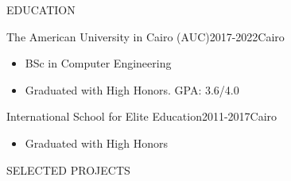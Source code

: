 \documentclass{resume}
\begin{document}
\begin{minipage}[t]{0.54\textwidth}

	\begin{rsection}{\MakeUppercase{education}}

		\begin{rcontent}{The American University in Cairo (AUC)}{2017-2022}{Cairo}
			\begin{itemize}
				\item BSc in Computer Engineering
				\item Graduated with High Honors. GPA: 3.6/4.0
			\end{itemize}
		\end{rcontent}
		\divider
		\begin{rcontent}{International School for Elite Education}{2011-2017}{Cairo}
			\begin{itemize}
				\item Graduated with High Honors
			\end{itemize}
		\end{rcontent}

	\end{rsection}

	\begin{rsection}{\MakeUppercase{selected projects}}


\end{rsection}
\end{minipage}
\end{document}
